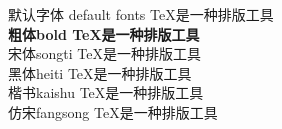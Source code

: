 \documentclass{ctexart}
\begin{document}
默认字体 default fonts \TeX 是一种排版工具\\
{\bfseries 粗体bold \TeX 是一种排版工具}\\
{\songti 宋体songti \TeX 是一种排版工具}\\
{\heiti 黑体heiti \TeX 是一种排版工具}\\
{\kaishu 楷书kaishu \TeX 是一种排版工具}\\
{\fangsong 仿宋fangsong \TeX 是一种排版工具}\\
\end{document}
